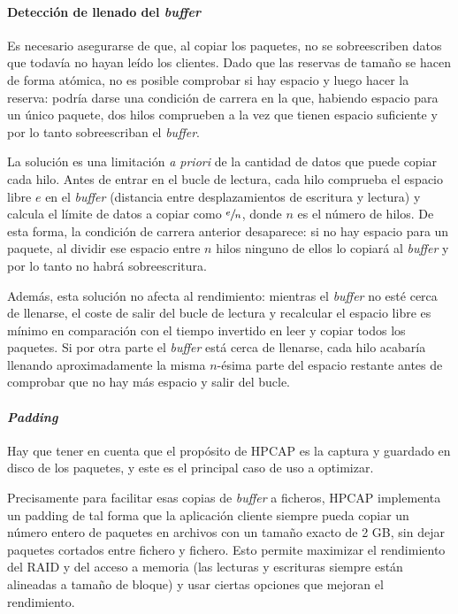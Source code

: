 \documentclass[oneside, draft]{epstfg}
\begin{document}
\paragraph{Detección de llenado del \textit{buffer}} Es necesario asegurarse de que, al copiar los paquetes, no se sobreescriben datos que todavía no hayan leído los clientes. Dado que las reservas de tamaño se hacen de forma atómica, no es posible comprobar si hay espacio y luego hacer la reserva: podría darse una condición de carrera en la que, habiendo espacio para un único paquete, dos hilos comprueben a la vez que tienen espacio suficiente y por lo tanto sobreescriban el \textit{buffer}.

La solución es una limitación \textit{a priori} de la cantidad de datos que puede copiar cada hilo. Antes de entrar en el bucle de lectura, cada hilo comprueba el espacio libre $e$ en el \textit{buffer} (distancia entre desplazamientos de escritura y lectura) y calcula el límite de datos a copiar como $\sfrac{e}{n}$, donde $n$ es el número de hilos. De esta forma, la condición de carrera anterior desaparece: si no hay espacio para un paquete, al dividir ese espacio entre $n$ hilos ninguno de ellos lo copiará al \textit{buffer} y por lo tanto no habrá sobreescritura.

Además, esta solución no afecta al rendimiento: mientras el \textit{buffer} no esté cerca de llenarse, el coste de salir del bucle de lectura y recalcular el espacio libre es mínimo en comparación con el tiempo invertido en leer y copiar todos los paquetes. Si por otra parte el \textit{buffer} está cerca de llenarse, cada hilo acabaría llenando aproximadamente la misma $n$-ésima parte del espacio restante antes de comprobar que no hay más espacio y salir del bucle.

\paragraph{\textit{Padding}} Hay que tener en cuenta que el propósito de HPCAP es la captura y guardado en disco de los paquetes, y este es el principal caso de uso a optimizar.

Precisamente para facilitar esas copias de \textit{buffer} a ficheros, HPCAP implementa un \gls{padding} \cite{MorenoTFM2012} de tal forma que la aplicación cliente siempre pueda copiar un número entero de paquetes en archivos con un tamaño exacto de 2 GB, sin dejar paquetes cortados entre fichero y fichero. Esto permite maximizar el rendimiento del \gls{RAID} y del acceso a memoria (las lecturas y escrituras siempre están alineadas a tamaño de bloque) y usar ciertas opciones que mejoran el rendimiento.
\end{document}
